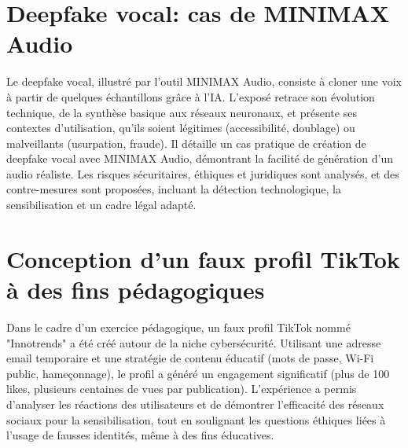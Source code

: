 \documentclass[12pt, a4paper]{article}
\begin{document}
\section{Deepfake vocal: cas de MINIMAX Audio}

Le deepfake vocal, illustré par l'outil MINIMAX Audio, consiste à cloner une voix à partir de quelques échantillons grâce à l'IA. L'exposé retrace son évolution technique, de la synthèse basique aux réseaux neuronaux, et présente ses contextes d'utilisation, qu'ils soient légitimes (accessibilité, doublage) ou malveillants (usurpation, fraude). Il détaille un cas pratique de création de deepfake vocal avec MINIMAX Audio, démontrant la facilité de génération d'un audio réaliste. Les risques sécuritaires, éthiques et juridiques sont analysés, et des contre-mesures sont proposées, incluant la détection technologique, la sensibilisation et un cadre légal adapté.

\section{Conception d'un faux profil TikTok à des fins pédagogiques}

Dans le cadre d'un exercice pédagogique, un faux profil TikTok nommé "Innotrends" a été créé autour de la niche cybersécurité. Utilisant une adresse email temporaire et une stratégie de contenu éducatif (mots de passe, Wi-Fi public, hameçonnage), le profil a généré un engagement significatif (plus de 100 likes, plusieurs centaines de vues par publication). L'expérience a permis d'analyser les réactions des utilisateurs et de démontrer l'efficacité des réseaux sociaux pour la sensibilisation, tout en soulignant les questions éthiques liées à l'usage de fausses identités, même à des fins éducatives.
\end{document}
